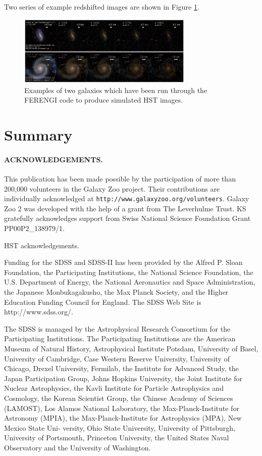 \documentclass[usenatbib]{mn2e}
\begin{document}
Two series of example redshifted images are shown in Figure \ref{exampleFERENGI}.

\begin{figure}
\includegraphics[width=84mm]{example_ferengi.ps}
\caption{Examples of two galaxies which have been run through the FERENGI code to produce simulated HST images. \label{exampleFERENGI}}
\end{figure}
 


\section{Summary}

 
\paragraph*{ACKNOWLEDGEMENTS.} 

This publication has been made possible by the participation of more than 200,000 volunteers in the Galaxy Zoo project. Their contributions are individually acknowledged at \texttt{http://www.galaxyzoo.org/volunteers}. Galaxy Zoo 2 was developed with the help of a grant from The Leverhulme Trust. KS gratefully acknowledges support from Swiss National Science Foundation Grant PP00P2\_138979/1.

HST acknowledgements.

Funding for the SDSS and SDSS-II has been provided by the Alfred P. Sloan Foundation, the Participating Institutions, the National Science Foundation, the U.S. Department of Energy, the National Aeronautics and Space Administration, the Japanese Monbukagakusho, the Max Planck Society, and the Higher Education Funding Council for England. The SDSS Web Site is http://www.sdss.org/. 

The SDSS is managed by the Astrophysical Research Consortium for the Participating Institutions. The Participating Institutions are the American Museum of Natural History, Astrophysical  Institute Potsdam, University of Basel, University of Cambridge, 
Case Western Reserve University, University of Chicago, Drexel University, Fermilab, the Institute for Advanced Study, the Japan 
Participation Group, Johns Hopkins University, the Joint Institute for Nuclear Astrophysics, the Kavli Institute for Particle Astrophysics and Cosmology, the Korean Scientist Group, the Chinese Academy of Sciences (LAMOST), Los Alamos National Laboratory, the Max-Planck-Institute for Astronomy (MPIA), the Max-Planck-Institute for Astrophysics (MPA), New Mexico State Uni- 
versity, Ohio State University, University of Pittsburgh, University of Portsmouth, Princeton University, the United States Naval Observatory and the University of Washington. 


\begin{thebibliography}{}

\end{thebibliography}
\end{document}
